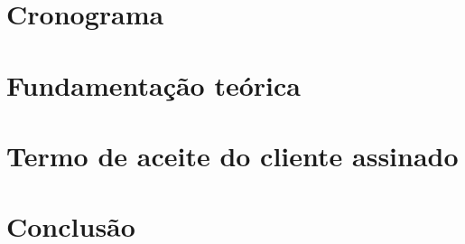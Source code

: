\documentclass[12pt,oneside,a4paper,article]{abntex2}
\begin{document}
    \section{Cronograma}                    
                
    \vspace{12mm}                           
    
    \newpage                                     
    \section{Fundamentação teórica}              
           
    \vspace{12mm}                                
    
    \newpage                                        
    \section{Termo de aceite do cliente assinado}   
                     
    \vspace{12mm}                                   
    
    \newpage                                
    \section{Conclusão}                     
                 
    
    
\end{document}
